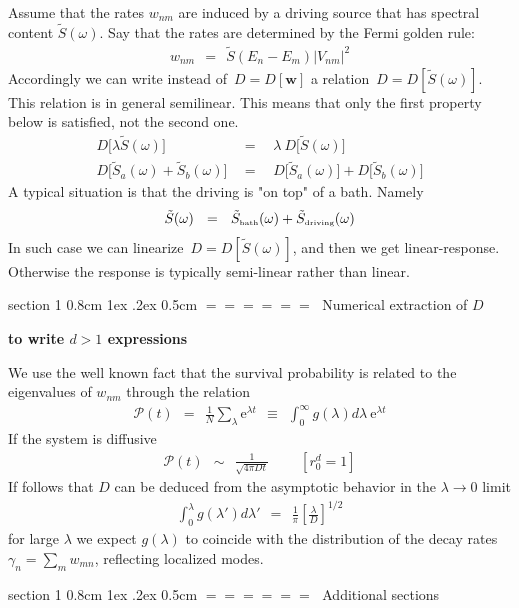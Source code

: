 \documentclass[onecolumn,fleqn,notitlepage,secnumarabic]{revtex4}
\makeatletter
\newcommand{\eexp}{\mbox{e}^}
\newcommand{\tbox}[1]{\mbox{\tiny #1}}
\newcommand{\beq}{\begin{eqnarray}}
\newcommand{\eeq}{\end{eqnarray}}
\def\section{%
  \@startsection
    {section}%
    {1}%
    {\z@}%
    {0.8cm \@plus1ex \@minus .2ex}%
    {0.5cm}%
    {\Large\bf $=\!=\!=\!=\!=\!=\;$}%
}%
\makeatother
\begin{document}
Assume that the rates $w_{nm}$ are induced 
by a driving source that has spectral content $\tilde{S}(\omega)$. 
Say that the rates are determined by the Fermi golden rule:
%
\beq
w_{nm} \ \ = \ \ \tilde{S}(E_n-E_m) |V_{nm}|^2
\eeq
%
Accordingly we can write instead of~$D=D[\bm{w}]$ a relation~$D=D[\tilde{S}(\omega)]$.
This relation is in general semilinear. This means that only the first property below 
is satisfied, not the second one.
%
\beq
D\big[ \lambda \tilde{S}(\omega)\big]  \ \ &=& \ \  \lambda \ D\big[\tilde{S}(\omega)\big] 
\\
D\big[\tilde{S}_a(\omega) + \tilde{S}_b(\omega)\big]  \ \ &=& \ \  D\big[\tilde{S}_a(\omega)\big] + D\big[\tilde{S}_b(\omega)\big]
\eeq
%
A typical situation is that the driving is "on top" of a bath. Namely 
%
\beq
\tilde{S}(\omega) \ \ = \ \ \tilde{S}_{\tbox{bath}}(\omega) + \tilde{S}_{\tbox{driving}}(\omega)
\eeq  
%
In such case we can linearize~$D=D[\tilde{S}(\omega)]$, and then we get 
linear-response. Otherwise the response is typically semi-linear rather than linear. 



\section{Numerical extraction of $D$}


{\bf to write $d>1$ expressions}

We use the well known fact that the survival probability 
is related to the eigenvalues of $w_{nm}$ through the relation
%
\beq
\mathcal{P}(t) \ \ = \ \ \frac{1}{N}\sum_\lambda \eexp{\lambda t} \ \ \equiv \ \ \int_0^{\infty} g(\lambda)d\lambda \ \eexp{\lambda t}
\eeq
%
If the system is diffusive
%
\beq
\mathcal{P}(t) \ \ \sim \ \  \frac{1}{\sqrt{4\pi D t}} 
\ \ \ \ \ \ \ \ \ \ [r_0^d=1]
\eeq
%
If follows that $D$ can be deduced from 
the asymptotic behavior in the ${\lambda\rightarrow 0}$ limit  
%
\beq
\int_0^\lambda g(\lambda')d\lambda' \ \ = \ \ \frac{1}{\pi}\left[\frac{\lambda}{D}\right]^{1/2}
\eeq
%
for large $\lambda$ we expect $g(\lambda)$ to coincide 
with the distribution of the decay rates $\gamma_n=\sum_{m}w_{mn}$, 
reflecting localized modes.



\section{Additional sections}
\end{document}
